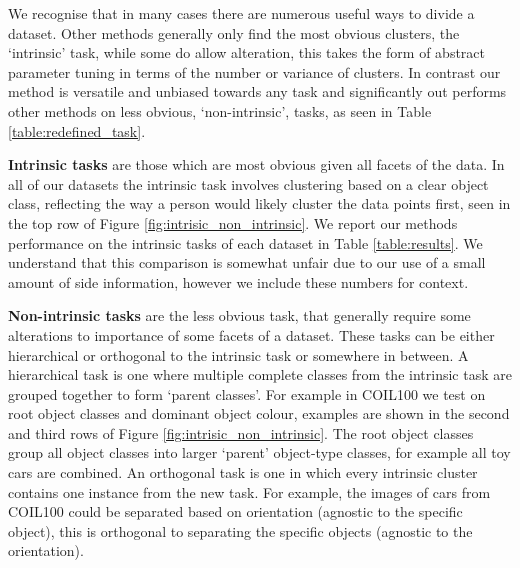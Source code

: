 \documentclass[letterpaper, 11pt]{IEEEtran}
\begin{document}
We recognise that in many cases
there are numerous useful ways to divide a dataset.
Other methods generally only find the most obvious clusters, the `intrinsic' task, while some do allow alteration, this takes the form of abstract parameter tuning in terms of the number or variance of clusters. In contrast our method is versatile and unbiased towards any task and significantly out performs other methods on less obvious, `non-intrinsic', tasks, as seen in Table \ref{table:redefined_task}.

\noindent\textbf{Intrinsic tasks} are those which are most obvious given all facets of the data. In all of our datasets the intrinsic task involves clustering based on a clear object class, reflecting the way a person would likely cluster the data points first, seen in the top row of Figure \ref{fig:intrisic_non_intrinsic}. 
We report our methods performance on the intrinsic tasks of each dataset in Table \ref{table:results}. 
We understand that this comparison is somewhat unfair due to our use of a small amount of side information, however we include these numbers for context.

\noindent\textbf{Non-intrinsic tasks} are the less obvious task, that generally require some alterations to importance of some facets of a dataset. These tasks can be either hierarchical or orthogonal to the intrinsic task or somewhere in between. A hierarchical task is one where multiple complete classes from the intrinsic task are grouped together to form `parent classes'. For example in COIL100 we test on root object classes and dominant object colour, examples are shown in the second and third rows of Figure \ref{fig:intrisic_non_intrinsic}. The root object classes group all object classes
into larger `parent' object-type classes, for example all toy cars are combined. An orthogonal task is one in which every intrinsic cluster contains one instance from the new task. For example, the images of cars from COIL100 could be separated based on orientation (agnostic to the specific object), this is orthogonal to separating the specific objects (agnostic to the orientation).
\end{document}
